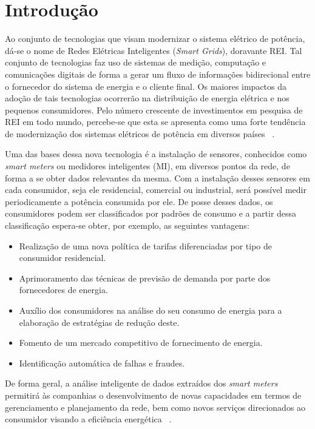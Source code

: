 \chapter{Introdução}
Ao conjunto de tecnologias que visam modernizar o sistema elétrico de potência, dá-se o nome de Redes Elétricas Inteligentes (\emph{Smart Grids}), doravante REI. Tal conjunto de tecnologias faz uso de sistemas de medição, computação e comunicações digitais de forma a gerar um fluxo de informações bidirecional entre o fornecedor do sistema de energia e o cliente final. Os maiores impactos da adoção de tais tecnologias ocorrerão na distribuição de energia elétrica e nos pequenos consumidores. Pelo número crescente de investimentos em pesquisa de REI em todo mundo, percebe-se que esta se apresenta como uma forte tendência de modernização dos sistemas elétricos de potência em diversos países ~\parencite{REI}.

Uma das bases dessa nova tecnologia é a instalação de sensores, conhecidos como \emph{smart meters} ou medidores inteligentes (MI),  em diversos pontos da rede, de forma a se obter dados relevantes da mesma. Com a instalação desses sensores em cada consumidor, seja ele residencial, comercial ou industrial, será possível medir periodicamente a potência consumida por ele. De posse desses dados, os consumidores podem ser classificados por padrões de consumo e a partir dessa classificação espera-se obter, por exemplo, as seguintes vantagens:
\begin{itemize}
	\item Realização de uma nova política de tarifas diferenciadas por tipo de consumidor residencial.
	\item Aprimoramento das técnicas de previsão de demanda por parte dos fornecedores
	de energia.
	\item Auxílio dos consumidores na análise do seu consumo de energia para a elaboração
	de estratégias de redução deste.
	\item Fomento de um mercado competitivo de fornecimento de energia.
	\item Identificação automática de falhas e fraudes.
\end{itemize}

De forma geral, a análise inteligente de dados extraídos dos \emph{smart meters} permitirá
às companhias o desenvolvimento de novas capacidades em termos de gerenciamento e
planejamento da rede, bem como novos serviços direcionados ao consumidor visando a
eficiência energética ~\parencite{ReviewElectric}.

